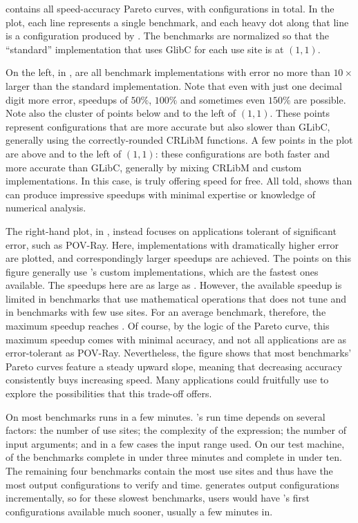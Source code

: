 \documentclass[paper.tex]{subfiles}
\begin{document}
 contains all \nBenchmarks
  speed-accuracy Pareto curves,
  with \nBenchImpls configurations in total.
In the plot, each line represents a single benchmark,
  and each heavy dot along that line
  is a configuration produced by \name.
The benchmarks are
  normalized so that the ``standard'' implementation
  that uses GlibC for each use site is at $(1, 1)$.


On the left, in ,
  are all benchmark implementations
  with error no more than $10\times$ larger
  than the standard implementation.
Note that even with just one decimal digit more error,
  speedups of $50\%$, $100\%$
  and sometimes even $150\%$ are possible.
Note also the cluster of points
  below and to the left of $(1, 1)$.
These points represent configurations that are
  more accurate but also slower than GLibC,
  generally using the correctly-rounded CRLibM functions.
A few points in the plot are above and to the left of $(1, 1)$:
  these configurations are both faster and more accurate than GLibC,
  generally by mixing CRLibM and custom implementations.
In this case, \name is truly offering speed for free.
All told,  shows
  than \name can produce impressive speedups
  with minimal expertise or knowledge of numerical analysis.

The right-hand plot, in ,
  instead focuses on applications tolerant of significant error,
  such as POV-Ray.
Here, implementations with dramatically higher error are plotted,
  and correspondingly larger speedups are achieved.
The points on this figure generally use
  \name's custom implementations,
  which are the fastest ones available.
The speedups here are as large as \nBenchmarkLargeSpeedup.
However, the available speedup is limited
  in benchmarks that use mathematical operations
  that \name does not tune
  and in benchmarks with few use sites.
For an average benchmark, therefore,
  the maximum speedup reaches \nBenchmarkAvgMaxSpeedup.
Of course, by the logic of the Pareto curve,
  this maximum speedup comes with minimal accuracy,
  and not all applications are as error-tolerant as POV-Ray.
Nevertheless, the figure shows that most benchmarks' Pareto curves
  feature a steady upward slope,
  meaning that
  decreasing accuracy consistently buys increasing speed.
Many applications could fruitfully use \name
  to explore the possibilities that this trade-off offers.

On most benchmarks \name runs in a few minutes.
\name's run time depends on several factors:
  the number of use sites;
  the complexity of the expression;
  the number of input arguments;
  and in a few cases the input range used.
On our test machine,
  \nBenchmarksUnderThreeMinutes of the \nBenchmarks benchmarks complete in under three minutes
  and \nBenchmarksUnderTenMinutes complete in under ten.
The remaining four benchmarks contain the most use sites and thus have
  the most output configurations to verify and time.
\name generates output configurations incrementally,
  so for these slowest benchmarks,
  users would have \name's first configurations available much sooner,
  usually a few minutes in.
\end{document}
